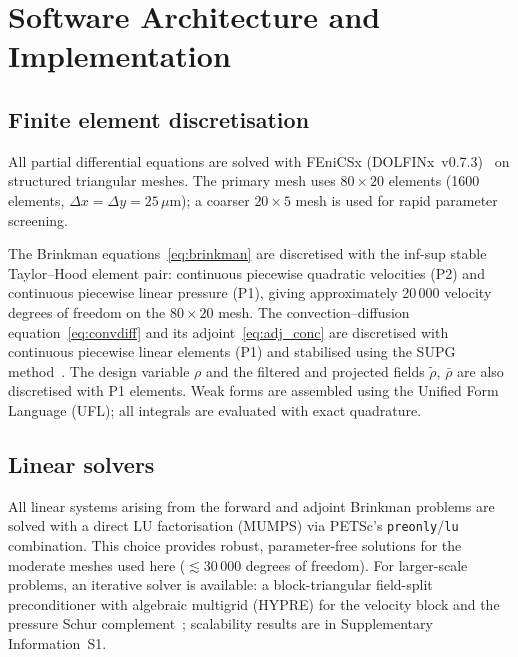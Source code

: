 \section{Software Architecture and Implementation}
\label{sec:methods}

\subsection{Finite element discretisation}
\label{sec:fem}
All partial differential equations are solved with FEniCSx
(DOLFINx~v0.7.3)~\cite{fenicsx2022} on structured triangular meshes.
The primary mesh uses $80\times20$ elements
(1600 elements, $\Delta x = \Delta y = 25\,\mu$m);
a coarser $20\times5$ mesh is used for rapid parameter screening.

The Brinkman equations~\eqref{eq:brinkman} are discretised with the
inf-sup stable Taylor--Hood element pair: continuous piecewise quadratic
velocities (P2) and continuous piecewise linear pressure (P1), giving
approximately 20\,000 velocity degrees of freedom on the $80\times20$ mesh.
The convection--diffusion equation~\eqref{eq:convdiff} and its
adjoint~\eqref{eq:adj_conc} are discretised with continuous piecewise
linear elements (P1) and stabilised using the SUPG method~\cite{donea2003}.
The design variable $\rho$ and the filtered and projected fields
$\tilde\rho$, $\bar\rho$ are also discretised with P1 elements.
Weak forms are assembled using the Unified Form Language (UFL);
all integrals are evaluated with exact quadrature.

\subsection{Linear solvers}
All linear systems arising from the forward and adjoint Brinkman problems
are solved with a direct LU factorisation (MUMPS) via PETSc's
\texttt{preonly}/\texttt{lu} combination.
This choice provides robust, parameter-free solutions for the moderate
meshes used here ($\lesssim 30\,000$ degrees of freedom).
For larger-scale problems, an iterative solver is available: a
block-triangular field-split preconditioner with algebraic multigrid
(HYPRE) for the velocity block and the pressure Schur
complement~\cite{elman2014}; scalability results are in
Supplementary Information~S1.

